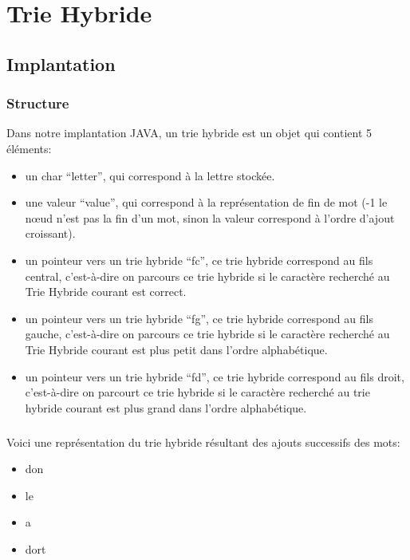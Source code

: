 \documentclass[a4paper,12pt]{report}
\begin{document}
\chapter{Trie Hybride}
\section{Implantation}
\subsection{Structure}
Dans notre implantation JAVA, un trie hybride est un objet qui contient 5 éléments:
\begin{itemize}
 \item un char ``letter'', qui correspond à la lettre stockée.
 \item une valeur ``value'', qui correspond à la représentation de fin de mot (-1 le nœud n'est pas la fin
 d'un mot, sinon la valeur correspond à l'ordre d'ajout croissant).
 \item un pointeur vers un trie hybride ``fc'', ce trie hybride correspond au fils central, c'est-à-dire on parcours ce
 trie hybride si le caractère recherché au Trie Hybride courant est correct.
 \item un pointeur vers un trie hybride ``fg'', ce trie hybride correspond au fils gauche, c'est-à-dire on parcours ce
 trie hybride si le caractère recherché au Trie Hybride courant est plus petit dans l'ordre alphabétique.
 \item un pointeur vers un trie hybride ``fd'', ce trie hybride correspond au fils droit, c'est-à-dire on parcourt ce
 trie hybride si le caractère recherché au trie hybride courant est plus grand dans l'ordre alphabétique.
\end{itemize}

\paragraph*{}
Voici une représentation du trie hybride résultant des ajouts successifs des mots:
\begin{itemize}
 \item don
 \item le
 \item a
 \item dort
\end{itemize}
\end{document}
